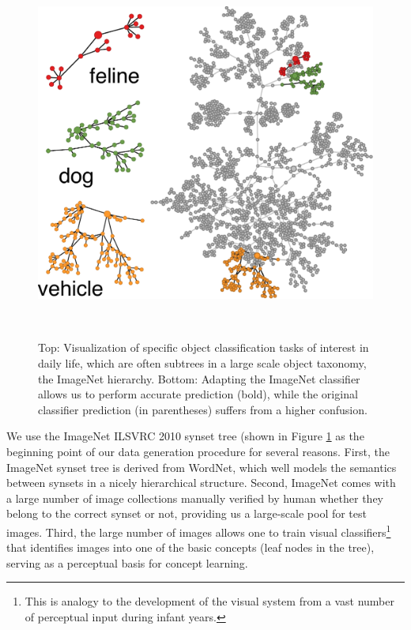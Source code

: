 \begin{figure}
\begin{minipage}{0.45\linewidth}
\begin{flushright}
        \introsep
        \introsep
        \introsep
        \\
        \introsep
        \introsep
        \introsep
        \end{flushright}
    \end{minipage}\hfill%
    \begin{minipage}{0.5\linewidth}
    \includegraphics[width=1.\textwidth]{figs/taskadaptation/ilsvrc_graph_stitched_reverse.pdf}
    \end{minipage}\\
    \caption{ Top: Visualization of specific object classification tasks of interest in daily life, which are often subtrees in a large scale object taxonomy, \eg the ImageNet hierarchy. Bottom: Adapting the ImageNet classifier allows us to perform accurate prediction (bold), while the original classifier prediction (in parentheses) suffers from a higher confusion.}\label{fig:ilsvrc2010tree}
\end{figure}



We use the ImageNet ILSVRC 2010 synset tree (shown in Figure \ref{fig:ilsvrc2010tree} as the beginning point of our data generation procedure for several reasons. First, the ImageNet synset tree is derived from WordNet, which well models the semantics between synsets in a nicely hierarchical structure. Second, ImageNet comes with a large number of image collections manually verified by human whether they belong to the correct synset or not, providing us a large-scale pool for test images. Third, the large number of images allows one to train visual classifiers\footnote{This is analogy to the development of the visual system from a vast number of perceptual input during infant years.} that identifies images into one of the basic concepts (leaf nodes in the tree), serving as a perceptual basis for concept learning.

